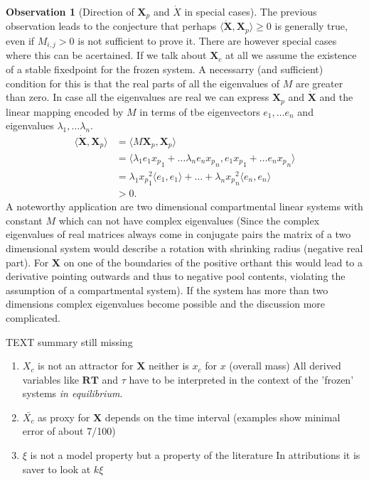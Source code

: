 \documentclass[journal abbreviation, manuscript]{copernicus}
\theoremstyle{definition}
\newtheorem{observation}{Observation}[section]
\newcommand{\X}{\mathbf{X}}
\newcommand{\RT}{\mathbf{RT}}
\begin{document}
\begin{observation}[Direction of $\X_p$ and $\dot{X}$ in special cases]
The previous observation leads to the conjecture that perhaps $\langle \dot{\X},\X_p \rangle \ge 0$ is generally true, even if $M_{i,j} > 0 $ is not sufficient to prove it.
There are however special cases where this can be acertained.
If we talk about $\X_c$ at all we assume the existence of a stable fixedpoint for the frozen system. A necessarry (and sufficient) condition for this is that the real parts of all the eigenvalues of $M$ are greater than zero. 
In case all the eigenvalues are real we can express $\X_p$ and $\dot{\X}$ and the linear mapping encoded by $M$ in terms of tbe eigenvectors $e_1,\dots e_n$ and eigenvalues $\lambda_1, \dots \lambda_n$.
\begin{align}
\langle \dot{\X},\X_p  \rangle 
&=
\langle M \X_p,\X_p  \rangle \\
&=
\langle 
  \lambda_1 e_1 {x_p}_1+\dots \lambda_n e_n {x_p}_n , 
  e_1 {x_p}_1+\dots e_n {x_p}_n
\rangle 
\\
&=
\lambda_1 {x_p}_1^2 \langle e_1,e_1 \rangle
+\dots +
\lambda_n{x_p}_n^2 \langle e_n,e_n \rangle
\\
&> 0.
\end{align}
A noteworthy application are two dimensional compartmental linear systems with constant $M$ which can not have complex eigenvalues (Since the complex eigenvalues of real matrices always come in conjugate pairs the matrix of a two dimensional system would describe a rotation with shrinking radius (negative real part). For $\X$ on one of the boundaries of the positive orthant this would lead to a derivative pointing outwards and thus to negative pool contents, violating the assumption of a compartmental system).
If the system has more than two dimensions complex eigenvalues become possible and the discussion more complicated.
\end{observation}


\conclusions  %
TEXT
{\color{red} summary still missing}

\begin{enumerate}
\item
$X_c$ is not an attractor for $\X$ neither is $x_c$ for $x$ (overall mass)
All derived variables like $\RT$ and $\tau$ have to be interpreted in the context of the 'frozen' systems \emph{in equilibrium}.
\item
$\bar{X_c}$ as proxy for $\X$ depends on the time interval (examples show minimal error of about 7/100)
\item
$\xi$ is not a model property but a property of the literature
In attributions it is saver to look at $k \xi$ 


\end{enumerate}
\end{document}
